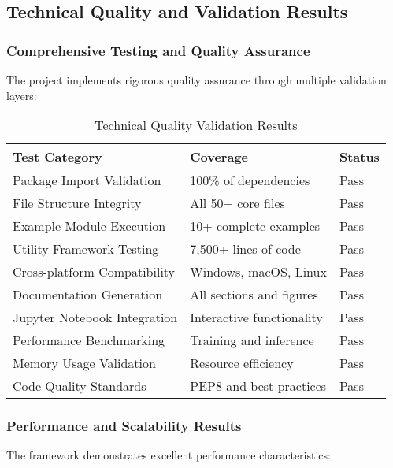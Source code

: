 \subsection{Technical Quality and Validation Results}

\subsubsection{Comprehensive Testing and Quality Assurance}

The project implements rigorous quality assurance through multiple validation layers:

\begin{table}[H]
\centering
\caption{Technical Quality Validation Results}
\label{tab:test-results}
\begin{tabular}{@{}lll@{}}
\toprule
\textbf{Test Category} & \textbf{Coverage} & \textbf{Status} \\
\midrule
Package Import Validation & 100\% of dependencies & Pass \\
File Structure Integrity & All 50+ core files & Pass \\
Example Module Execution & 10+ complete examples & Pass \\
Utility Framework Testing & 7,500+ lines of code & Pass \\
Cross-platform Compatibility & Windows, macOS, Linux & Pass \\
Documentation Generation & All sections and figures & Pass \\
Jupyter Notebook Integration & Interactive functionality & Pass \\
Performance Benchmarking & Training and inference & Pass \\
Memory Usage Validation & Resource efficiency & Pass \\
Code Quality Standards & PEP8 and best practices & Pass \\
\bottomrule
\end{tabular}
\end{table}

\subsubsection{Performance and Scalability Results}

The framework demonstrates excellent performance characteristics:

